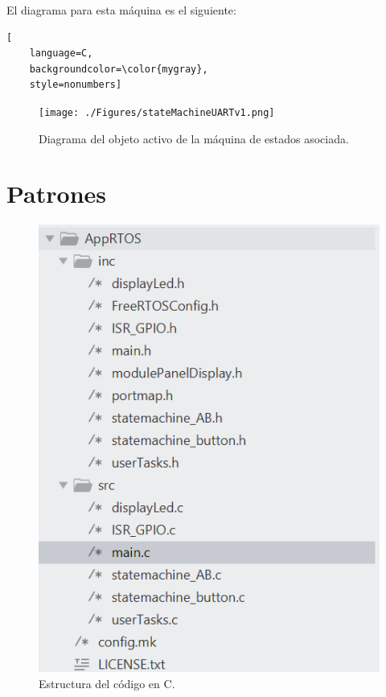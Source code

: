 El diagrama para esta máquina es el siguiente:

\begin{lstlisting}[
	language=C, 
	backgroundcolor=\color{mygray},
	style=nonumbers]
\end{lstlisting}


\begin{figure}[ht]
	\centering
	\texttt{[image: ./Figures/stateMachineUARTv1.png]}
	\caption{Diagrama del objeto activo de la máquina de estados asociada.}
	\label{fig:fsmUARTv1}
\end{figure}

	
\pagebreak
\section{Patrones}



\begin{figure}[ht]
	\centering
	\includegraphics[width=1\textwidth]{./Figures/estructuraCodigos.png}
	\caption{Estructura del código en C.}
	\label{fig:codestructure}
\end{figure}

